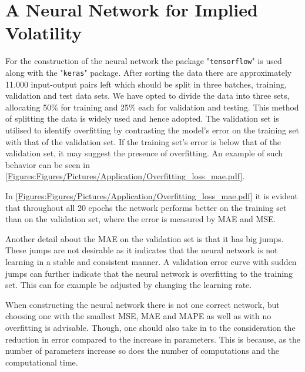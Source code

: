 \section{A Neural Network for Implied Volatility}
For the construction of the neural network the package "\lstinline{tensorflow}" is used along with the "\lstinline{keras}" package. After sorting the data there are approximately 11.000 input-output pairs left which should be split in three batches, training, validation and test data sets. We have opted to divide the data into three sets, allocating 50\% for training and 25\% each for validation and testing. This method of splitting the data is widely used and hence adopted. The validation set is utilised to identify overfitting by contrasting the model's error on the training set with that of the validation set. If the training set's error is below that of the validation set, it may suggest the presence of overfitting. An example of such behavior can be seen in \autoref{Figures:Figures/Pictures/Application/Overfitting_loss_mae.pdf}.

In \autoref{Figures:Figures/Pictures/Application/Overfitting_loss_mae.pdf} it is evident that throughout all 20 epochs the network performs better on the training set than on the validation set, where the error is measured by MAE and MSE.

Another detail about the MAE on the validation set is that it has big jumps. These jumps are not desirable as it indicates that the neural network is not learning in a stable and consistent manner. A validation error curve with sudden jumps can further indicate that the neural network is overfitting to the training set. This can for example be adjusted by changing the learning rate. 

When constructing the neural network there is not one correct network, but choosing one with the smallest MSE, MAE and MAPE as well as with no overfitting is advisable. Though, one should also take in to the consideration the reduction in error compared to the increase in parameters. This is because, as the number of parameters increase so does the number of computations and the computational time.

